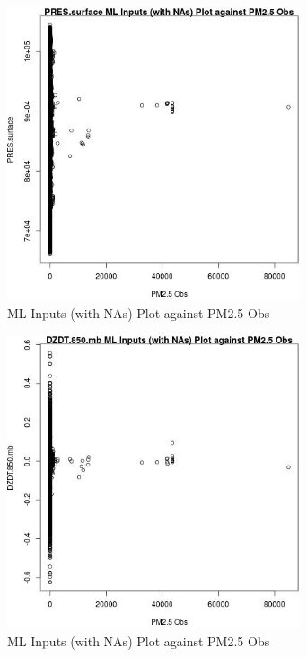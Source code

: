 \begin{figure} 
\centering  
\includegraphics[width=0.77\textwidth]{Code_Outputs/Report_ML_input_PM25_Step4_part_f_de_duplicated_aveswNAs_PRESsurfacevPM25_Obs.jpg} 
\caption{\label{fig:Report_ML_input_PM25_Step4_part_f_de_duplicated_aveswNAsPRESsurfacevPM25_Obs}ML Inputs (with NAs) Plot against PM2.5 Obs} 
\end{figure} 
 

\begin{figure} 
\centering  
\includegraphics[width=0.77\textwidth]{Code_Outputs/Report_ML_input_PM25_Step4_part_f_de_duplicated_aveswNAs_DZDT850mbvPM25_Obs.jpg} 
\caption{\label{fig:Report_ML_input_PM25_Step4_part_f_de_duplicated_aveswNAsDZDT850mbvPM25_Obs}ML Inputs (with NAs) Plot against PM2.5 Obs} 
\end{figure} 
 

